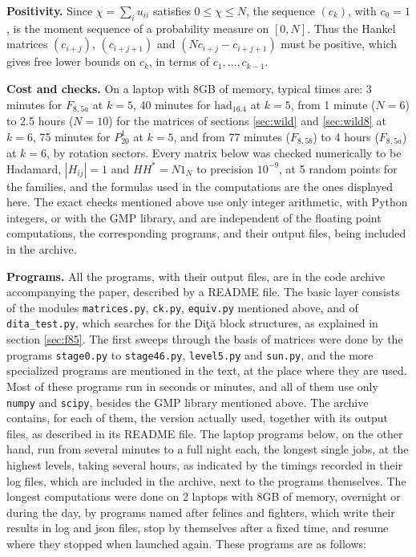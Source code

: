 \documentclass[11pt]{amsart}
\begin{document}
\medskip

\noindent\textbf{Positivity.} Since $\chi=\sum_iu_{ii}$ satisfies $0\leq\chi\leq N$, the sequence $(c_k)$, with $c_0=1$, is the moment sequence of a probability measure on $[0,N]$. Thus the Hankel matrices $(c_{i+j})$, $(c_{i+j+1})$ and $(Nc_{i+j}-c_{i+j+1})$ must be positive, which gives free lower bounds on $c_k$, in terms of $c_1,\ldots,c_{k-1}$.

\medskip

\noindent\textbf{Cost and checks.} On a laptop with 8GB of memory, typical times are: 3 minutes for $F_{8,5a}$ at $k=5$, 40 minutes for $\mathrm{had}_{16.4}$ at $k=5$, from 1 minute ($N=6$) to 2.5 hours ($N=10$) for the matrices of sections \ref{sec:wild} and \ref{sec:wild8} at $k=6$, 75 minutes for $P_{20}^1$ at $k=5$, and from 77 minutes ($F_{8,5b}$) to 4 hours ($F_{8,5a}$) at $k=6$, by rotation sectors. Every matrix below was checked numerically to be Hadamard, $|H_{ij}|=1$ and $HH^*=N1_N$ to precision $10^{-9}$, at 5 random points for the families, and the formulas used in the computations are the ones displayed here. The exact checks mentioned above use only integer arithmetic, with Python integers, or with the GMP library, and are independent of the floating point computations, the corresponding programs, and their output files, being included in the archive.
\medskip

\noindent\textbf{Programs.} All the programs, with their output files, are in the code archive accompanying the paper, described by a README file. The basic layer consists of the modules \texttt{matrices.py}, \texttt{ck.py}, \texttt{equiv.py} mentioned above, and of \texttt{dita\_test.py}, which searches for the Di\c t\u a block structures, as explained in section \ref{sec:f85}. The first sweeps through the basis of matrices were done by the programs \texttt{stage0.py} to \texttt{stage46.py}, \texttt{level5.py} and \texttt{sun.py}, and the more specialized programs are mentioned in the text, at the place where they are used. Most of these programs run in seconds or minutes, and all of them use only \texttt{numpy} and \texttt{scipy}, besides the GMP library mentioned above. The archive contains, for each of them, the version actually used, together with its output files, as described in its README file. The laptop programs below, on the other hand, run from several minutes to a full night each, the longest single jobs, at the highest levels, taking several hours, as indicated by the timings recorded in their log files, which are included in the archive, next to the programs themselves. The longest computations were done on 2 laptops with 8GB of memory, overnight or during the day, by programs named after felines and fighters, which write their results in log and json files, stop by themselves after a fixed time, and resume where they stopped when launched again. These programs are as follows:
\end{document}
